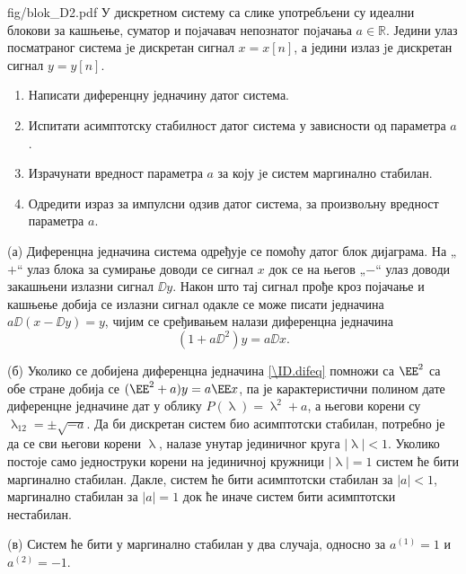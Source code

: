 \begin{slikaDesno}{fig/blok_D2.pdf}
    \PID У дискретном систему са слике употребљени су идеални блокови за кашњење,
    суматор и поjачавач непознатог поjачања $a \in \mathbb R$. 
    Једини улаз посматраног
    система jе дискретан сигнал $x = x[n]$, а једини излаз jе дискретан сигнал $y = y[n]$.
\end{slikaDesno}
\begin{enumerate}[label=(\alph*)]
    \item Написати диференцну једначину датог система.
    \item Испитати асимптотску стабилност датог система у зависности од параметра $a$.
    \item Израчунати вредност параметра $a$ за коју jе систем маргинално стабилан.
    \item Одредити израз за импулсни одзив датог система, за произвољну вредност параметра $a$.
\end{enumerate}

\RESENJE
(а) Диференцна једначина система одређује се помоћу датог блок дијаграма. На „$+$“ улаз блока за сумирање 
доводи се сигнал $x$ док се на његов „$-$“ улаз доводи закашњени излазни сигнал $\DD y$. Након што 
тај сигнал прође кроз појачање и кашњење добија се излазни сигнал одакле се може писати 
једначина $a \DD ( x - \DD y) = y$, чијим се сређивањем налази диференцна једначина 
\begin{equation}
    (1 + a \DD^2) y = a \DD x. \label{\ID.difeq}
\end{equation}

(б) Уколико се добијена диференцна једначина \eqref{\ID.difeq} помножи са $\EE^2$ са обе стране добија се 
$(\EE^2 + a)y = a \EE x$, па је карактеристични полином дате диференцне једначине дат у облику 
$P(\uplambda) = \uplambda^2 + a$, а његови корени су 
$\uplambda_{12} = \pm \sqrt{-a}$. Да би дискретан систем био асимптотски стабилан, потребно је да се сви његови 
корени $\uplambda$, налазе унутар јединичног круга $|\uplambda| < 1$. Уколико постоје само 
једноструки корени на јединичној 
кружници $|\uplambda| = 1$ систем ће бити маргинално стабилан. 
Дакле, систем ће бити асимптотски стабилан за $|a| < 1$, маргинално стабилан за $|a| = 1$ док ће иначе 
систем бити асимптотски нестабилан.

(в) Систем ће бити у маргинално стабилан у два случаја, односно за $a^{(1)} = 1$ и $a^{(2)} = -1$.  

